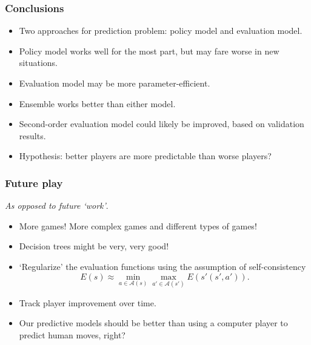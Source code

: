 \documentclass{beamer}
\begin{document}
\begin{frame}
\frametitle{Conclusions}
\begin{itemize}
\item Two approaches for prediction problem: policy model and evaluation model.
\item Policy model works well for the most part, but may fare worse in new situations.
\item Evaluation model may be more parameter-efficient.
\item Ensemble works better than either model.
\item Second-order evaluation model could likely be improved, based on validation results.
\item Hypothesis: better players are more predictable than worse players?
\end{itemize}
\end{frame}

\begin{frame}
\frametitle{Future play}
\emph{As opposed to future `work'}.
\begin{itemize}
\item More games! More complex games and different types of games!
\item Decision trees might be very, very good!
\item `Regularize' the evaluation functions using the assumption of self-consistency
\[
E(s) \approx \min_{a \in \mathcal{A}(s)} \max_{a' \in \mathcal{A}(s')} E(s'(s', a')).
\]
\item Track player improvement over time.
\item Our predictive models should be better than using a computer player to predict human moves, right?
\end{itemize}
\end{frame}
\end{document}
